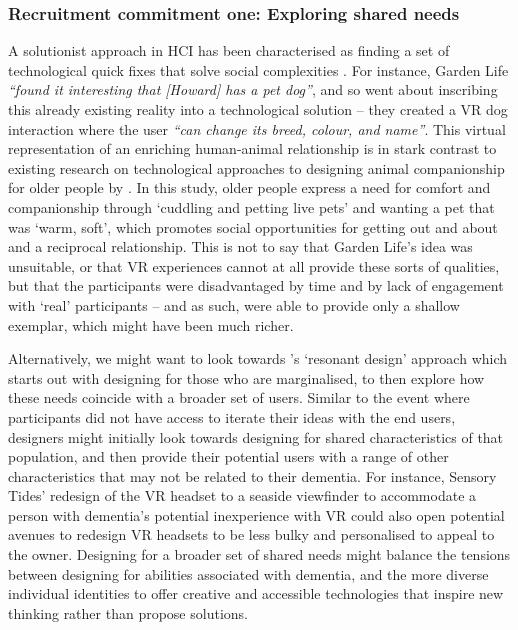 \subsubsection{Recruitment commitment one: Exploring shared needs }
\label{DiscussionOne:CommitOne}
A solutionist approach in HCI has been characterised as finding a set of technological quick fixes that solve social complexities \citep{cramer2014save}. For instance, Garden Life \textit{``found it interesting that [Howard] has a pet dog''}, and so went about inscribing this already existing reality into a technological solution – they created a VR dog interaction where the user \textit{``can change its breed, colour, and name''}. This virtual representation of an enriching human-animal relationship is in stark contrast to existing research on technological approaches to designing animal companionship for older people by \cite{lazar_rethinking_2016}. In this study, older people express a need for comfort and companionship through ‘cuddling and petting live pets’ and wanting a pet that was `warm, soft', which promotes social opportunities for getting out and about and a reciprocal relationship. This is not to say that Garden Life’s idea was unsuitable, or that VR experiences cannot at all provide these sorts of qualities, but that the participants were disadvantaged by time and by lack of engagement with `real' participants – and as such, were able to provide only a shallow exemplar, which might have been much richer.

Alternatively, we might want to look towards \citeauthor{pullin2009design}'s \citeyear{pullin2009design} `resonant design' approach which starts out with designing for those who are marginalised, to then explore how these needs coincide with a broader set of users. Similar to the event where participants did not have access to iterate their ideas with the end users, designers might initially look towards designing for shared characteristics of that population, and then provide their potential users with a range of other characteristics that may not be related to their dementia. For instance, Sensory Tides' redesign of the VR headset to a seaside viewfinder to accommodate a person with dementia’s potential inexperience with VR could also open potential avenues to redesign VR headsets to be less bulky and personalised to appeal to the owner. Designing for a broader set of shared needs might balance the tensions between designing for abilities associated with dementia, and the more diverse individual identities to offer creative and accessible technologies that inspire new thinking rather than propose solutions.

